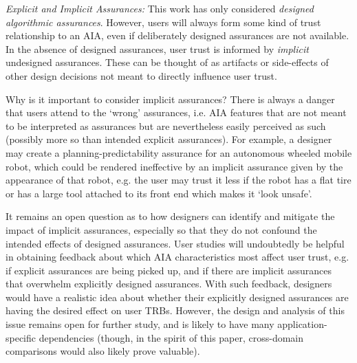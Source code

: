 \emph{Explicit and Implicit Assurances:}
This work has only considered \emph{designed algorithmic assurances}. However, users will always form some kind of trust relationship to an AIA, even if deliberately designed assurances are not available. In the absence of designed assurances, user trust is informed by \emph{implicit} undesigned assurances. These can be thought of as artifacts or side-effects of other design decisions not meant to directly influence user trust.

Why is it important to consider implicit assurances? There is always a danger that users attend to the `wrong' assurances, i.e. AIA features that are not meant to be interpreted as assurances but are nevertheless easily perceived as such (possibly more so than intended explicit assurances). For example, a designer may create a planning-predictability assurance for an autonomous wheeled mobile robot, which could be rendered ineffective by an implicit assurance given by the appearance of that robot, e.g. the user may trust it less if the robot has a flat tire or has a large tool attached to its front end which makes it `look unsafe'. 

It remains an open question as to how designers can identify and mitigate the impact of implicit assurances, especially so that they do not confound the intended effects of designed assurances. 
User studies will undoubtedly be helpful in obtaining feedback about which AIA characteristics most affect user trust, e.g. if explicit assurances are being picked up, and if there are implicit assurances that overwhelm explicitly designed assurances. With such feedback, designers would have a realistic idea about whether their explicitly designed assurances are having the desired effect on user TRBs. 
However, the design and analysis of this issue remains open for further study, and is likely to have many application-specific dependencies (though, in the spirit of this paper, cross-domain comparisons would also likely prove valuable). 
